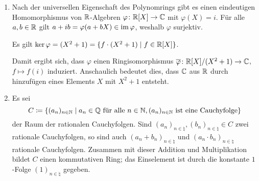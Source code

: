 \begin{example}
  \begin{enumerate}
    \item
      Nach der universellen Eigenschaft des Polynomrings gibt es einen eindeutigen Homomorphismus von $\mathbb{R}$-Algebren $\varphi \colon \mathbb{R}[X] \to \mathbb{C}$ mit $\varphi(X) = i$.
      Für alle $a, b \in \mathbb{R}$ gilt $a + ib = \varphi(a + bX) \in \operatorname{im} \varphi$, weshalb $\varphi$ surjektiv.
      
      \begin{claim}
        Es gilt $\ker \varphi = (X^2 + 1) = \{f \cdot (X^2 + 1) \mid f \in \mathbb{R}[X]\}$.
      \end{claim}
      
      Damit ergibt sich, dass $\varphi$ einen Ringisomorphismus $\overline{\varphi} \colon \mathbb{R}[X]/(X^2 + 1) \to \mathbb{C}$, $f \mapsto f(i)$ induziert.
      Anschaulich bedeutet dies, dass $\mathbb{C}$ aus $\mathbb{R}$ durch hinzufügen eines Elements $X$ mit $X^2 + 1$ entsteht.
      
    \item
      Es sei
      \[
                  C
        \coloneqq \{
                    (a_n)_{n \in \mathbb{N}}
                  \mid
                    \text{$a_n \in \mathbb{Q}$ für alle $n \in \mathbb{N}$},
                    \text{$(a_n)_{n \in \mathbb{N}}$ ist eine Cauchyfolge}
                  \}
      \]
      der Raum der rationalen Cauchyfolgen.
      Sind $(a_n)_{n \in \natural}, (b_n)_{n \in \natural} \in C$ zwei rationale Cauchyfolgen, so sind auch $(a_n + b_n)_{n \in \natural}$ und $(a_n \cdot b_n)_{n \in \natural}$ rationale Cauchyfolgen.
      Zusammen mit dieser Addition und Multiplikation bildet $C$ einen kommutativen Ring;
      das Einselement ist durch die konstante $1$-Folge $(1)_{n \in \natural}$ gegeben.
      

\end{enumerate}
\end{example}

